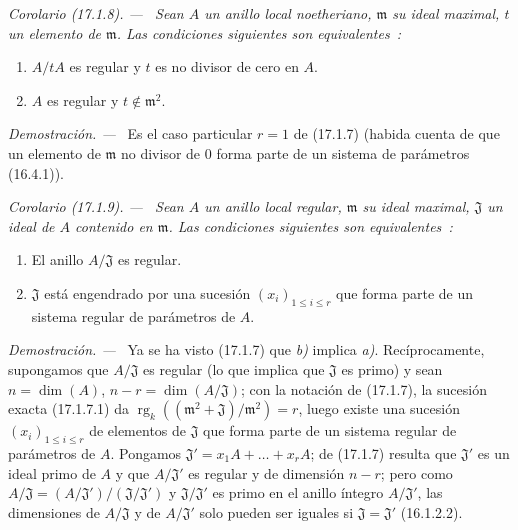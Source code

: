 \documentclass[10pt,oneside]{book}
\makeatletter
\newcommand{\setmanualcurrentlabel}[1]{\def\@currentlabel{#1}}
\newcommand{\oldpage}[2][]{%
  \setcounter{footnote}{0}%
  \marginpar{\scriptsize\textbf{#1}~|~#2}\ignorespaces}
\newenvironment{corollary}[1][]{%
  \setmanualcurrentlabel{#1}\par\medskip\noindent\itshape Corolario (#1). ---\ }{\par}
\newenvironment{proof}{%
  \par\medskip\noindent\textit{Demostración. ---\ }}{\par}
\makeatother
\begin{document}
\oldpage[0\textsubscript{IV-1}]{42}

\begin{corollary}[17.1.8]
\label{0.17.1.8-es}
Sean $A$ un anillo local noetheriano, $\mathfrak{m}$ su ideal maximal, $t$ un
elemento de $\mathfrak{m}$. Las condiciones siguientes son equivalentes~:
\begin{enumerate}
  \item[\rm a)] $A/tA$ es regular y $t$ es no divisor de cero en $A$.
  \item[\rm b)] $A$ es regular y $t\notin\mathfrak{m}^2$.
\end{enumerate}
\end{corollary}

\begin{proof}
Es el caso particular $r=1$ de (17.1.7) (habida cuenta de que un elemento de
$\mathfrak{m}$ no divisor de $0$ forma parte de un sistema de parámetros
(16.4.1)).
\end{proof}

\begin{corollary}[17.1.9]
\label{0.17.1.9-es}
Sean $A$ un anillo local regular, $\mathfrak{m}$ su ideal maximal,
$\mathfrak{J}$ un ideal de $A$ contenido en $\mathfrak{m}$. Las condiciones
siguientes son equivalentes~:
\begin{enumerate}
  \item[\rm a)] El anillo $A/\mathfrak{J}$ es regular.
  \item[\rm b)] $\mathfrak{J}$ está engendrado por una sucesión
  $(x_i)_{1\leq i\leq r}$ que forma parte de un sistema regular de parámetros
  de $A$.
\end{enumerate}
\end{corollary}

\begin{proof}
Ya se ha visto (17.1.7) que \emph{b)} implica \emph{a)}. Recíprocamente, supongamos que
$A/\mathfrak{J}$ es regular (lo que implica que $\mathfrak{J}$ es primo)
y sean $n=\dim(A)$, $n-r=\dim(A/\mathfrak{J})$; con la notación de
(17.1.7), la sucesión exacta (17.1.7.1) da
$\operatorname{rg}_k((\mathfrak{m}^2+\mathfrak{J})/\mathfrak{m}^2)=r$, luego
existe una sucesión $(x_i)_{1\leq i\leq r}$ de elementos de $\mathfrak{J}$ que
forma parte de un sistema regular de parámetros de $A$. Pongamos
$\mathfrak{J}'=x_1A+\ldots+x_rA$; de (17.1.7) resulta que $\mathfrak{J}'$
es un ideal primo de $A$ y que $A/\mathfrak{J}'$ es regular y de
dimensión $n-r$; pero como
$A/\mathfrak{J}=(A/\mathfrak{J}')/(\mathfrak{J}/\mathfrak{J}')$ y
$\mathfrak{J}/\mathfrak{J}'$ es primo en el anillo íntegro
$A/\mathfrak{J}'$, las dimensiones de $A/\mathfrak{J}$ y de
$A/\mathfrak{J}'$ solo pueden ser iguales si
$\mathfrak{J}=\mathfrak{J}'$ (16.1.2.2).
\end{proof}
\end{document}

